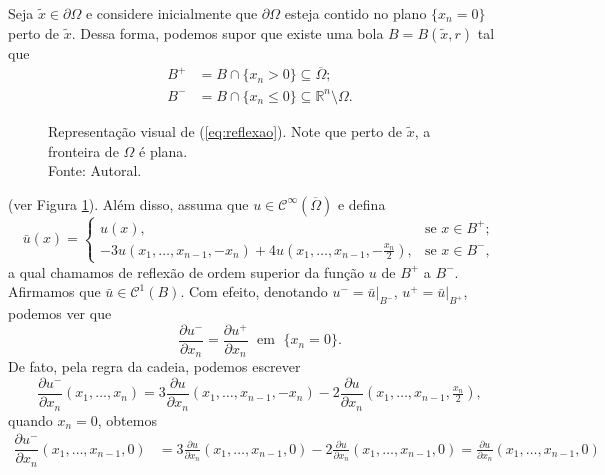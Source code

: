 \documentclass[a4paper, 11pt]{book}
\theoremstyle{definition}
\newcommand{\bR}{\mathbb{R}}
\newcommand{\cC}{\mathcal{C}}
\begin{document}
\begin{prf}
    Seja $\tilde x \in \partial\Omega$ e considere inicialmente que $\partial\Omega$ esteja contido no plano $\{x_n = 0\}$ perto de $\tilde x$.
    Dessa forma, podemos supor que existe uma bola $B = B(\tilde x, r)$ tal que
    \begin{equation} \label{eq:reflexao}
        \begin{aligned}
            B^+ &= B \cap \{x_n > 0\} \subseteq \overline\Omega;\\
            B^- &= B \cap \{x_n \leqslant 0\} \subseteq \bR^n \setminus \Omega.
        \end{aligned}
    \end{equation}
    \begin{figure}
        \centering
        
        \caption{Representação visual de (\ref{eq:reflexao}). Note que perto de $\tilde x$, a fronteira de $\Omega$ é plana.\\Fonte: Autoral.}
        \label{fig:BmaisBmenos}
    \end{figure}
    (ver Figura \ref{fig:BmaisBmenos}).
    Além disso, assuma que $u \in \cC^\infty(\overline\Omega)$ e defina
    \begin{equation} \label{eq:barux}
        \bar u(x) =
        \left\{ 
            \begin{array}{ll}
                u(x), & \text{se } x\in B^+;\\
                -3u(x_1,\dots,x_{n-1}, -x_n) + 4u(x_1,\dots,x_{n-1},-\frac{x_n}{2}), & \text{se } x \in B^-,
            \end{array}
        \right.
    \end{equation}
    a qual chamamos de reflexão de ordem superior da função $u$ de $B^+$ a $B^-$.
    Afirmamos que $\bar u \in \cC^1(B)$.
    Com efeito, denotando $u^- = \bar u \big|_{B^-}$, $u^+ = \bar u \big|_{B^+}$, podemos ver que
    \[
        \dfrac{\partial u^-}{\partial x_n} = \dfrac{\partial u^+}{\partial x_n} \;\text{ em }\; \{x_n = 0\}.
    \]
    De fato, pela regra da cadeia, podemos escrever
    \[
        \dfrac{\partial u^-}{\partial x_n}(x_1,\dots,x_n) = 3 \frac{\partial u}{\partial x_n}(x_1,\dots,x_{n-1}, -x_n)  - 2\frac{\partial u}{\partial x_n}(x_1,\dots,x_{n-1},\tfrac{x_n}{2}),
    \]
    quando $x_n = 0$, obtemos
    \[
        \begin{aligned}
            \dfrac{\partial u^-}{\partial x_n}(x_1,\dots,x_{n-1},0)
         &= 3\frac{\partial u}{\partial x_n}(x_1,\dots,x_{n-1},0) - 2\frac{\partial u}{\partial x_n}(x_1,\dots,x_{n-1},0) = \frac{\partial u}{\partial x_n}(x_1,\dots,x_{n-1},0)\\[5pt] 

\end{aligned}\]
\end{prf}
\end{document}
